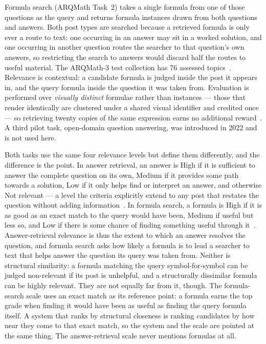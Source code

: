Formula search (ARQMath Task~2) takes a single formula from one of those
questions as the query and returns formula instances drawn from both questions
and answers. Both post types are searched because a retrieved formula is only
ever a route to text: one occurring in an answer may sit in a worked solution,
and one occurring in another question routes the searcher to that question's own
answers, so restricting the search to answers would discard half the routes to
useful material. The ARQMath-3 test collection has 76 assessed
topics~\cite{mansouri2022arqmath3}. Relevance is contextual: a candidate formula
is judged inside the post it appears in, and the query formula inside the
question it was taken from. Evaluation is performed over \emph{visually
distinct} formulae rather than instances --- those that render identically are
clustered under a shared visual identifier and credited once --- so retrieving
twenty copies of the same expression earns no additional
reward~\cite{mansouri2021effects}. A third pilot task, open-domain question
answering, was introduced in 2022 and is not used here.

Both tasks use the same four relevance levels but define them differently, and
the difference is the point. In answer retrieval, an answer is High if it is
sufficient to answer the complete question on its own, Medium if it provides
some path towards a solution, Low if it only helps find or interpret an answer,
and otherwise Not relevant --- a level the criteria explicitly extend to any
post that restates the question without adding
information~\cite{mansouri2022arqmath3}. In formula search, a formula is High if
it is as good as an exact match to the query would have been, Medium if useful
but less so, and Low if there is some chance of finding something useful through
it~\cite{mansouri2022arqmath3}. Answer-retrieval relevance is thus the extent to
which an answer resolves the question, and formula search asks how likely a
formula is to lead a searcher to text that helps answer the question its query
was taken from. Neither is structural similarity: a formula matching the query
symbol-for-symbol can be judged non-relevant if its post is unhelpful, and a
structurally dissimilar formula can be highly relevant. They are not equally far
from it, though. The formula-search scale uses an exact match as its reference
point: a formula earns the top grade when finding it would have been as useful
as finding the query formula itself. A system that ranks by structural closeness
is ranking candidates by how near they come to that exact match, so the system
and the scale are pointed at the same thing. The answer-retrieval scale never
mentions formulas at all.

